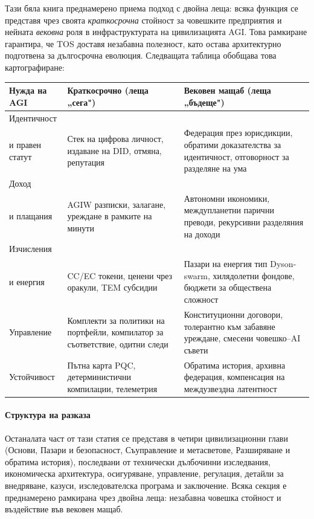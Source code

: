 \documentclass[11pt]{article}
\begin{document}
Тази бяла книга преднамерено приема подход с двойна леща: всяка функция се представя чрез своята \emph{краткосрочна} стойност за човешките предприятия и нейната \emph{вековна} роля в инфраструктурата на цивилизацията AGI. Това рамкиране гарантира, че TOS доставя незабавна полезност, като остава архитектурно подготвена за дългосрочна еволюция. Следващата таблица обобщава това картографиране:

\begin{longtable}{@{}p{}p{}p{}@{}}
\toprule
\textbf{Нужда на AGI} & \textbf{Краткосрочно (леща „сега")} & \textbf{Вековен мащаб (леща „бъдеще")} \\\midrule
Идентичност \\ и правен статут & Стек на цифрова личност, издаване на DID, отмяна, репутация & Федерация през юрисдикции, обратими доказателства за идентичност, отговорност за разделяне на ума \\
Доход \\ и плащания & AGIW разписки, залагане, уреждане в рамките на минути & Автономни икономики, междупланетни парични преводи, рекурсивни разделяния на доходи \\
Изчисления \\ и енергия & CC/EC токени, ценени чрез оракули, TEM субсидии & Пазари на енергия тип Dyson-swarm, хилядолетни фондове, бюджети за обществена сложност \\
Управление & Комплекти за политики на портфейли, компилатор за съответствие, одитни следи & Конституционни договори, толерантно към забавяне уреждане, смесени човешко--AI съвети \\
Устойчивост & Пътна карта PQC, детерминистични компилации, телеметрия & Обратима история, архивна федерация, компенсация на междузвездна латентност \\\bottomrule
\end{longtable}

\paragraph{Структура на разказа} Останалата част от тази статия се представя в четири цивилизационни глави (Основи, Пазари и безопасност, Съуправление и метасветове, Разширяване и обратима история), последвани от технически дълбочинни изследвания, икономическа архитектура, осигуряване, управление, регулация, детайли за внедряване, казуси, изследователска програма и заключение. Всяка секция е преднамерено рамкирана чрез двойна леща: незабавна човешка стойност и въздействие във вековен мащаб.
\end{document}
